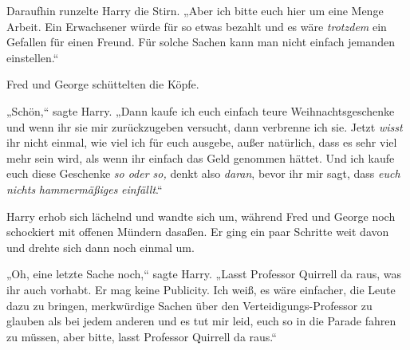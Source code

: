 Daraufhin runzelte Harry die Stirn. „Aber ich bitte euch hier um eine Menge Arbeit. Ein Erwachsener würde für so etwas bezahlt und es wäre \emph{trotzdem} ein Gefallen für einen Freund. Für solche Sachen kann man nicht einfach jemanden einstellen.“

Fred und George schüttelten die Köpfe.

„Schön,“ sagte Harry. „Dann kaufe ich euch einfach teure Weihnachtsgeschenke und wenn ihr sie mir zurückzugeben versucht, dann verbrenne ich sie. Jetzt \emph{wisst} ihr nicht einmal, wie viel ich für euch ausgebe, außer natürlich, dass es sehr viel mehr sein wird, als wenn ihr einfach das Geld genommen hättet. Und ich kaufe euch diese Geschenke \emph{so oder so,} denkt also \emph{daran}, bevor ihr mir sagt, dass \emph{euch nichts} \emph{hammermäßiges} \emph{einfällt}.“%

Harry erhob sich lächelnd und wandte sich um, während Fred und George noch schockiert mit offenen Mündern dasaßen. Er ging ein paar Schritte weit davon und drehte sich dann noch einmal um.

„Oh, eine letzte Sache noch,“ sagte Harry. „Lasst Professor Quirrell da raus, was ihr auch vorhabt. Er mag keine Publicity. Ich weiß, es wäre einfacher, die Leute dazu zu bringen, merkwürdige Sachen über den Verteidigungs-Professor zu glauben als bei jedem anderen und es tut mir leid, euch so in die Parade fahren zu müssen, aber bitte, lasst Professor Quirrell da raus.“

